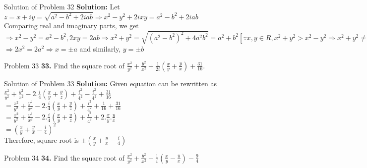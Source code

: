 \documentclass[aspectratio=169,8pt]{beamer}
\begin{document}
\begin{frame}{Solution of Problem 32}
  \textbf{Solution:} Let $z = x + iy = \sqrt{a^2 - b^2 + 2iab}\Rightarrow x^2 - y^2 + 2ixy = a^2 - b^2 + 2iab$\\
  \vspace*{0.2cm}
  Comparing real and imaginary parts, we get\\
  \vspace*{0.7cm}
  $\Rightarrow x^2 - y^2 = a^2 - b^2, 2xy = 2ab \Rightarrow x^2 + y^2 = \sqrt{(a^2 - b^2)^2 + 4a^2b^2} = a^2 + b^2[\because x,y \in R, x^2 + y^2 > x^2 - y^2 \Rightarrow x^2 + y^2 \neq -(a^2 + b^2)]$\\
  \vspace*{0.2cm}
  $\Rightarrow 2x^2 = 2a^2 \Rightarrow x = \pm a$ and similarly, $y = \pm b$
\end{frame}
\begin{frame}{Problem 33}
  \textbf{33.} Find the square root of $\frac{x^2}{y^2} + \frac{y^2}{x^2} + \frac{1}{2i}\left(\frac{x}{y} + \frac{y}{x}\right) + \frac{31}{16}.$
\end{frame}
\begin{frame}{Solution of Problem 33}
  \textbf{Solution:} Given equation can be rewritten as $\frac{x^2}{y^2} + \frac{y^2}{x^2} -2.\frac{i}{4}\left(\frac{x}{y} + \frac{y}{z}\right) + \frac{i^2}{4^2} - \frac{i^2}{4^2} + \frac{31}{16}$\\
  \vspace*{0.2cm}
  $= \frac{x^2}{y^2} + \frac{y^2}{x^2} -2.\frac{i}{4}\left(\frac{x}{y} + \frac{y}{z}\right) + \frac{i^2}{4^2} + \frac{1}{16} + \frac{31}{16}$\\
  \vspace*{0.2cm}
  $= \frac{x^2}{y^2} + \frac{y^2}{x^2} -2.\frac{i}{4}\left(\frac{x}{y} + \frac{y}{z}\right) + \frac{i^2}{4^2} + 2.\frac{x}{y}.\frac{y}{x}$\\
  \vspace*{0.2cm}
  $= \left(\frac{x}{y} + \frac{y}{x} - \frac{i}{4}\right)^2$\\
  \vspace*{0.2cm}
  Therefore, square root is $\pm\left(\frac{x}{y} + \frac{y}{x} - \frac{i}{4}\right)$
\end{frame}
\begin{frame}{Problem 34}
  \textbf{34.} Find the square root of $\frac{x^2}{y^2} + \frac{y^2}{x^2} - \frac{1}{i}\left(\frac{x}{y} - \frac{y}{x}\right) - \frac{9}{4}$
\end{frame}
\end{document}
